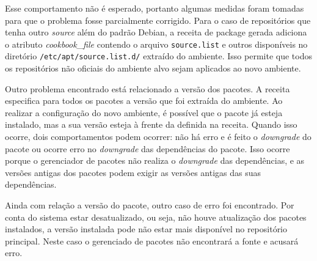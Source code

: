 Esse comportamento não é esperado, portanto algumas medidas foram tomadas para
que o problema fosse parcialmente corrigido. Para o caso de repositórios que
tenha outro \textit{source} além do padrão Debian, a receita de package gerada adiciona
o atributo \textit{cookbook\_file} contendo o arquivo \texttt{source.list} e outros disponíveis
no diretório \texttt{/etc/apt/source.list.d/} extraído do ambiente. Isso permite
que todos os repositórios não oficiais do ambiente alvo sejam aplicados ao novo ambiente.

%
%  

Outro problema encontrado está relacionado a versão dos pacotes.
A receita especifica para todos os pacotes a versão que foi extraída do ambiente.
Ao realizar a configuração do novo ambiente, é possível que o pacote já esteja instalado,
mas a sua versão esteja à frente da definida na receita. Quando isso ocorre, dois comportamentos
podem ocorrer: não há erro e é feito o \textit{downgrade} do pacote ou ocorre erro no \textit{downgrade} das
dependências do pacote. Isso ocorre porque o gerenciador de pacotes não realiza o \textit{downgrade}
das dependências, e as versões antigas dos pacotes podem exigir as versões antigas das suas
dependências.

%
%  

Ainda com relação a versão do pacote, outro caso de erro foi encontrado.
Por conta do sistema estar desatualizado, ou seja, não houve atualização dos pacotes
instalados, a versão instalada pode não estar mais disponível no repositório principal.
Neste caso o gerenciado de pacotes não encontrará a fonte e acusará erro.

